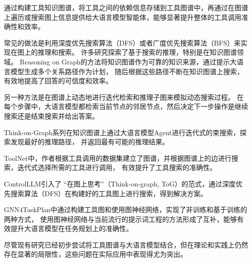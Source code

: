 通过构建工具知识图谱，将工具之间的依赖信息存储到工具图谱中，再通过在图谱上遍历或搜索图上信息提供给大语言模型智能体，能够显著提升整体的工具调用准确性和效率。

常见的做法是利用深度优先搜索算法（DFS）或者广度优先搜索算法（BFS）来实现在图上的推理和搜索。
许多研究探索了基于搜索的推理，特别是在知识图谱领域。
Reasoning on Graph\cite{Luo2023}的方法将知识图谱作为可靠的知识来源，通过提示大语言模型生成多个关系路径作为计划，
随后根据这些路径不断在知识图谱上搜索，有效地提高了回答的可信度和效率。

另一种方法是在图谱上动态地进行迭代检索和推理子图来模拟动态搜索过程\cite{Liu2024, Sun2023, Ma2024}。
在每个步骤中，大语言模型都检索当前节点的邻居节点，然后决定下一步操作是继续搜索还是结束搜索并给出答案。


Think-on-Graph系列\cite{Sun2023,Ma2024}在知识图谱上通过大语言模型Agent进行迭代式的束搜索，探索发现最好的推理路径，
并返回最有可能的推理结果。

ToolNet\cite{Liu2024}中，作者根据工具调用的数据集建立了图谱，并根据图谱上的边进行搜索，迭代式选择所需的工具进行调用，
有效提升了工具搜索的准确性。

ControlLLM\cite{Liu2023a}引入了 “在图上思考”（Think-on-graph, ToG）的范式，通过深度优先搜索算法（DFS）在构建好的工具图上进行搜索，得到解决方案。

GNN4TaskPlan中\cite{wucan2024}通过构建工具图和使用图神经网络，实现了非训练和基于训练的两种方式，
使用图神经网络与当前流行的提示词工程的方法形成了互补，能够有效提升大语言模型在任务规划上的准确性。



尽管现有研究已经初步尝试将工具图谱与大语言模型结合，但在理论和实践上仍然存在显著的局限性，这些问题在实际应用中表现得尤为突出。

